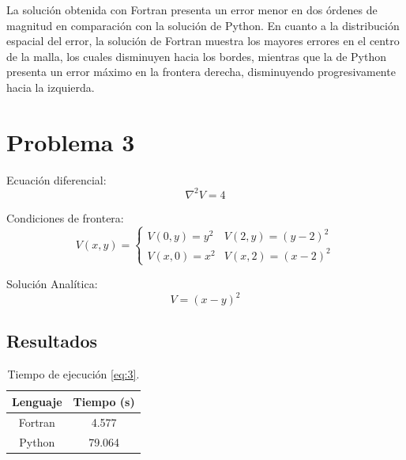 \documentclass[12pt,a4paper]{article}
\begin{document}
La solución obtenida con Fortran presenta un error menor en dos
órdenes de magnitud en comparación con la solución de Python.
En cuanto a la distribución espacial del error, la solución de
Fortran muestra los mayores errores en el centro de la malla,
los cuales disminuyen hacia los bordes, mientras que la de Python
presenta un error máximo en la frontera derecha, disminuyendo
progresivamente hacia la izquierda.

\newpage

\section*{Problema 3}%
\label{sec:Problema 3}

Ecuación diferencial:
\begin{equation}
  \nabla^2{V} = 4
  \label{eq:3}
\end{equation}

Condiciones de frontera:
\begin{equation}
  V(x, y) =
  \begin{cases}
    V(0, y) = y^2 & V(2, y) = (y - 2)^2 \\
    V(x, 0) = x^2 & V(x, 2) = (x - 2)^2
  \end{cases}
\end{equation}

Solución Analítica:
\begin{equation}
  V = (x - y)^2
\end{equation}

\subsection*{Resultados}%
\label{sub:Resultados-3}

\begin{table}[htbp!]
  \centering
  \begin{tabular}{@{}c|S[table-format=2.3]@{}}
    \toprule
    Lenguaje  & {Tiempo (s)} \\
    \midrule
    Fortran & 4.577 \\
    Python & 79.064 \\
    \bottomrule
  \end{tabular}
  \caption{Tiempo de ejecución \cref{eq:3}.}
\end{table}
\end{document}
